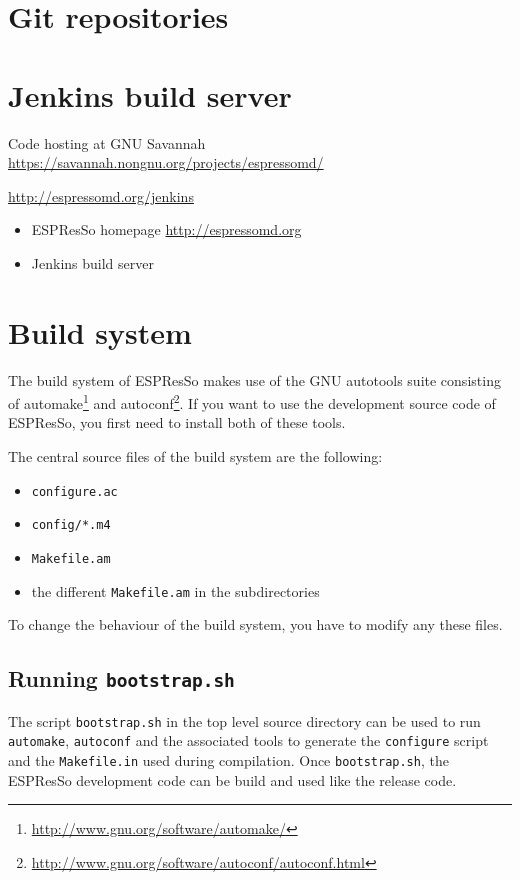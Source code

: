 \documentclass[
a4paper,                        %
11pt,                           %
twoside,                        %
footsepline,                    %
headsepline,                    %
headexclude,                    %
footexclude,                    %
pagesize,                       %
bibtotocnumbered,               %
idxtotoc                        %
]{scrreprt}
\newcommand{\es}{\mbox{\textsf{ESPResSo}}\xspace}
\begin{document}
\section{Git repositories}
\label{sec:git}

\section{Jenkins build server}
\label{sec:jenkins}

Code hosting at GNU Savannah 
  \url{https://savannah.nongnu.org/projects/espressomd/}

\url{http://espressomd.org/jenkins}
\begin{itemize}
\item \es homepage \url{http://espressomd.org}
\item Jenkins build server 
\end{itemize}

\section{Build system}
\label{sec:build_system}

The build system of \es makes use of the GNU autotools suite
consisting of
automake\footnote{\url{http://www.gnu.org/software/automake/}} and
autoconf\footnote{\url{http://www.gnu.org/software/autoconf/autoconf.html}}.
If you want to use the development source code of ESPResSo, you first
need to install both of these tools.

The central source files of the build system are the following:
\begin{itemize}
\item \texttt{configure.ac}
\item \texttt{config/*.m4}
\item \texttt{Makefile.am}
\item the different \texttt{Makefile.am} in the subdirectories
\end{itemize}

To change the behaviour of the build system, you have to modify any
these files.

\subsection{Running \texttt{bootstrap.sh}}

The script \texttt{bootstrap.sh} in the top level source directory can
be used to run \texttt{automake}, \texttt{autoconf} and the associated
tools to generate the \texttt{configure} script and the
\texttt{Makefile.in} used during compilation.  Once
\texttt{bootstrap.sh}, the \es development code can be build and used
like the release code.
\end{document}
